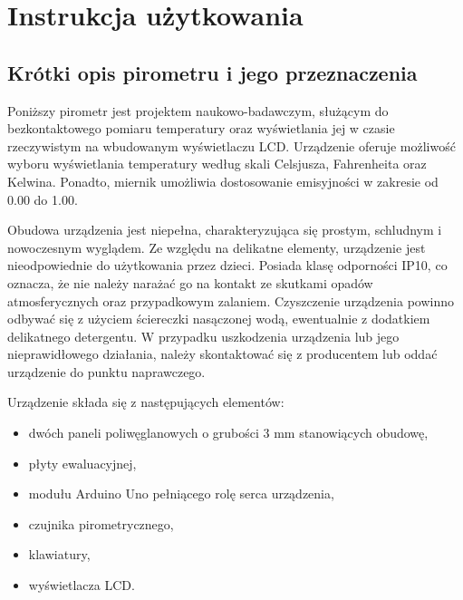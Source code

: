 \chapter{Instrukcja użytkowania}
\section{Krótki opis pirometru i jego przeznaczenia}

Poniższy pirometr jest projektem naukowo-badawczym, służącym do bezkontaktowego pomiaru temperatury oraz wyświetlania jej w czasie rzeczywistym na wbudowanym wyświetlaczu LCD. Urządzenie oferuje możliwość wyboru wyświetlania temperatury według skali Celsjusza, Fahrenheita oraz Kelwina. Ponadto, miernik umożliwia dostosowanie emisyjności w zakresie od 0.00 do 1.00.

\vspace{12pt}

Obudowa urządzenia jest niepełna, charakteryzująca się prostym, schludnym i nowoczesnym wyglądem. Ze względu na delikatne elementy, urządzenie jest nieodpowiednie do użytkowania przez dzieci. Posiada klasę odporności IP10, co oznacza, że nie należy narażać go na kontakt ze skutkami opadów atmosferycznych oraz przypadkowym zalaniem. Czyszczenie urządzenia powinno odbywać się z użyciem ściereczki nasączonej wodą, ewentualnie z dodatkiem delikatnego detergentu. W przypadku uszkodzenia urządzenia lub jego nieprawidłowego działania, należy skontaktować się z producentem lub oddać urządzenie do punktu naprawczego.

\newpage

Urządzenie składa się z następujących elementów:
\begin{itemize}
    \item dwóch paneli poliwęglanowych o grubości 3 mm stanowiących obudowę,
    \item płyty ewaluacyjnej,
    \item modułu Arduino Uno pełniącego rolę serca urządzenia,
    \item czujnika pirometrycznego,
    \item klawiatury,
    \item wyświetlacza LCD.
\end{itemize}


